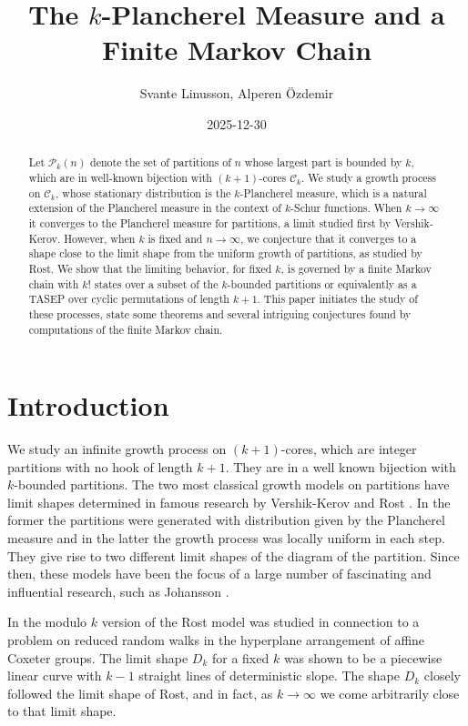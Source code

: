 \documentclass[11pt]{amsart}
\title[The $k$-Plancherel measure and a Finite Markov Chain]{The $k$-Plancherel Measure and a Finite Markov Chain}
\author{Svante Linusson, Alperen \"{O}zdemir}
\date{2025-12-30}
\begin{document}
\begin{abstract}
Let $\mathcal{P}_k(n)$ denote the set of partitions of $n$ whose largest part is bounded by $k,$ which are in 
well-known bijection with $(k+1)$-cores $\mathcal{C}_k$. We study a growth process on $\mathcal{C}_k$, whose stationary distribution is the $k$-Plancherel measure, which is a natural extension of the Plancherel measure in the context of $k$-Schur functions. When $k\to\infty$ it converges to the Plancherel measure for partitions, a limit studied first by Vershik-Kerov. 
However, when $k$ is fixed and $n\to \infty$, we conjecture that it converges to a shape close to the limit shape from the uniform growth of partitions, as studied by Rost. 
We show that the limiting behavior, for fixed $k$, is governed by a finite Markov chain with $k!$ states over a subset of the $k$-bounded partitions or equivalently as a TASEP over cyclic permutations of length $k+1$. 
This paper initiates the study of these processes, state some theorems and several intriguing conjectures found by computations of the finite Markov chain.

\end{abstract}


\maketitle



\section{Introduction}

We study an infinite growth process on $(k+1)$-cores, which are integer partitions with no hook of length $k+1$. They are in a well known bijection with $k$-bounded partitions. The two most classical growth models on partitions have limit shapes determined in famous research by Vershik-Kerov \cite{VK77} and Rost \cite{R81}. In the former the partitions were generated with distribution given by the Plancherel measure and in the latter the growth process was locally uniform in each step. They give rise to two different limit shapes of the diagram of the partition. Since then, these models have been the focus of a large number of fascinating and influential research, such as Johansson \cite{J00}. 

In \cite{AL14,L15} the modulo $k$ version of the Rost model was studied in connection to a problem on reduced random walks in the hyperplane arrangement of affine Coxeter groups. The limit shape $D_k$ for a fixed $k$ was shown to be a piecewise linear curve with $k-1$ straight lines of deterministic slope. The  shape $D_k$ closely followed the limit shape of Rost, and in fact, as $k\to \infty$ we come arbitrarily close to that limit shape.
\end{document}

